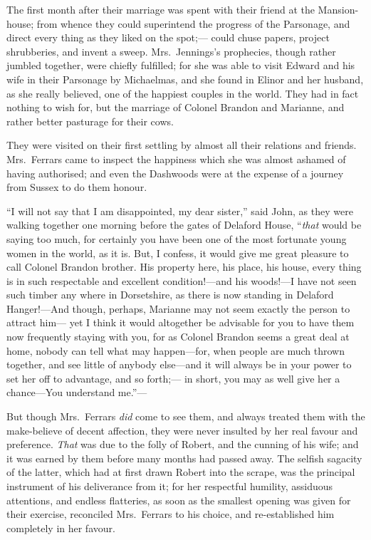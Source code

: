 \documentclass{article}
\begin{document}
The first month after their marriage was spent
with their friend at the Mansion-house; from whence
they could superintend the progress of the Parsonage,
and direct every thing as they liked on the spot;---%
could chuse papers, project shrubberies, and invent a sweep.
Mrs.\ Jennings's prophecies, though rather jumbled together,
were chiefly fulfilled; for she was able to visit Edward
and his wife in their Parsonage by Michaelmas, and she
found in Elinor and her husband, as she really believed,
one of the happiest couples in the world.  They had
in fact nothing to wish for, but the marriage of Colonel
Brandon and Marianne, and rather better pasturage for
their cows.

They were visited on their first settling by almost
all their relations and friends.  Mrs.\ Ferrars came
to inspect the happiness which she was almost ashamed
of having authorised; and even the Dashwoods were at
the expense of a journey from Sussex to do them honour.

``I will not say that I am disappointed, my dear sister,''
said John, as they were walking together one morning before
the gates of Delaford House, ``\emph{that} would be saying too much,
for certainly you have been one of the most fortunate young
women in the world, as it is.  But, I confess, it would
give me great pleasure to call Colonel Brandon brother.
His property here, his place, his house, every thing is in
such respectable and excellent condition!---and his woods!---I
have not seen such timber any where in Dorsetshire, as there
is now standing in Delaford Hanger!---And though, perhaps,
Marianne may not seem exactly the person to attract him---%
yet I think it would altogether be advisable for you to
have them now frequently staying with you, for as Colonel
Brandon seems a great deal at home, nobody can tell what
may happen---for, when people are much thrown together,
and see little of anybody else---and it will always be
in your power to set her off to advantage, and so forth;---%
in short, you may as well give her a chance---You understand
me.''---%

But though Mrs.\ Ferrars \emph{did} come to see them, and always
treated them with the make-believe of decent affection,
they were never insulted by her real favour and preference.
\emph{That} was due to the folly of Robert, and the cunning
of his wife; and it was earned by them before many months
had passed away.  The selfish sagacity of the latter,
which had at first drawn Robert into the scrape,
was the principal instrument of his deliverance from it;
for her respectful humility, assiduous attentions,
and endless flatteries, as soon as the smallest opening
was given for their exercise, reconciled Mrs.\ Ferrars
to his choice, and re-established him completely in
her favour.
\end{document}
